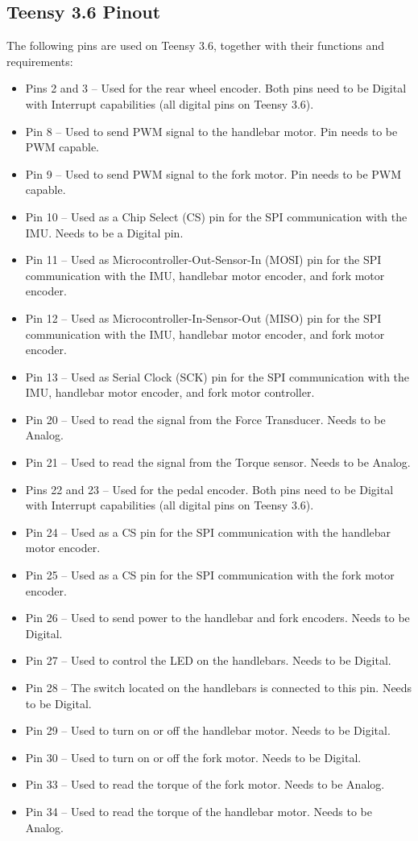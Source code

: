 \subsection{Teensy 3.6 Pinout}
The following pins are used on Teensy 3.6, together with their functions and requirements:
\begin{itemize}[noitemsep]
  \item Pins 2 and 3 -- Used for the rear wheel encoder. Both pins need to be Digital with Interrupt capabilities (all digital pins on Teensy 3.6).
  \item Pin 8 -- Used to send PWM signal to the handlebar motor. Pin needs to be PWM capable.
  \item Pin 9 -- Used to send PWM signal to the fork motor. Pin needs to be PWM capable.
  \item Pin 10 -- Used as a Chip Select (CS) pin for the SPI communication with the IMU. Needs to be a Digital pin.
  \item Pin 11 -- Used as Microcontroller-Out-Sensor-In (MOSI) pin for the SPI communication with the IMU, handlebar motor encoder, and fork motor encoder.
  \item Pin 12 -- Used as Microcontroller-In-Sensor-Out (MISO) pin for the SPI communication with the IMU, handlebar motor encoder, and fork motor encoder.
  \item Pin 13 -- Used as Serial Clock (SCK) pin for the SPI communication with the IMU, handlebar motor encoder, and fork motor controller.
  \item Pin 20 -- Used to read the signal from the Force Transducer. Needs to be Analog.
  \item Pin 21 -- Used to read the signal from the Torque sensor. Needs to be Analog.
  \item Pins 22 and 23 -- Used for the pedal encoder. Both pins need to be Digital with Interrupt capabilities (all digital pins on Teensy 3.6).
  \item Pin 24 -- Used as a CS pin for the SPI communication with the handlebar motor encoder.
  \item Pin 25 -- Used as a CS pin for the SPI communication with the fork motor encoder.
  \item Pin 26 -- Used to send power to the handlebar and fork encoders. Needs to be Digital.
  \item Pin 27 -- Used to control the LED on the handlebars. Needs to be Digital.
  \item Pin 28 -- The switch located on the handlebars is connected to this pin. Needs to be Digital.
  \item Pin 29 -- Used to turn on or off the handlebar motor. Needs to be Digital.
  \item Pin 30 -- Used to turn on or off the fork motor. Needs to be Digital.
  \item Pin 33 -- Used to read the torque of the fork motor. Needs to be Analog.
  \item Pin 34 -- Used to read the torque of the handlebar motor. Needs to be Analog.
\end{itemize}

